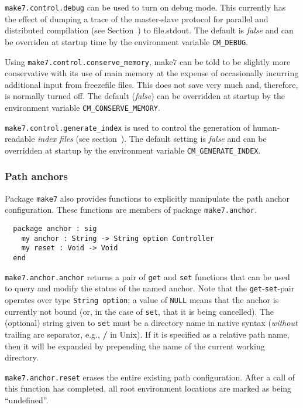 {\tt make7.control.debug} can be used to turn on debug mode.  This
currently has the effect of dumping a trace of the master-slave
protocol for parallel and distributed compilation (see
Section~) to file.stdout. The default is {\em
false} and can be overriden at startup time by the environment
variable {\tt CM\_DEBUG}.

Using {\tt make7.control.conserve\_memory}, make7 can be told to be slightly
more conservative with its use of main memory at the expense of
occasionally incurring additional input from freezefile files.
This does not save very much and, therefore, is normally turned off.
The default ({\em false}) can be overridden at startup by the
environment variable {\tt CM\_CONSERVE\_MEMORY}.

{\tt make7.control.generate\_index} is used to control the generation of
human-readable {\em index files} (see section~).
The default setting is {\em false} and can be overridden at startup by
the environment variable {\tt CM\_GENERATE\_INDEX}.

\subsubsection{Path anchors}
\label{sec:api:anchors}

Package {\tt make7} also provides functions to explicitly manipulate
the path anchor configuration.  These functions are members of
package {\tt make7.anchor}.

\begin{verbatim}
  package anchor : sig
    my anchor : String -> String option Controller
    my reset : Void -> Void
  end
\end{verbatim}

{\tt make7.anchor.anchor} returns a pair of {\tt get} and {\tt set}
functions that can be used to query and modify the status of the named
anchor.  Note that the {\tt get}-{\tt set}-pair operates over type
{\tt String option}; a value of {\tt NULL} means that the anchor is
currently not bound (or, in the case of {\tt set}, that it is being
cancelled).  The (optional) string given to {\tt set} must be a
directory name in native syntax ({\em without} trailing arc separator,
e.g., {\bf /} in Unix).  If it is specified as a relative path name,
then it will be expanded by prepending the name of the current working
directory.

{\tt make7.anchor.reset} erases the entire existing path configuration.
After a call of this function has completed, all root environment
locations are marked as being ``undefined''.

